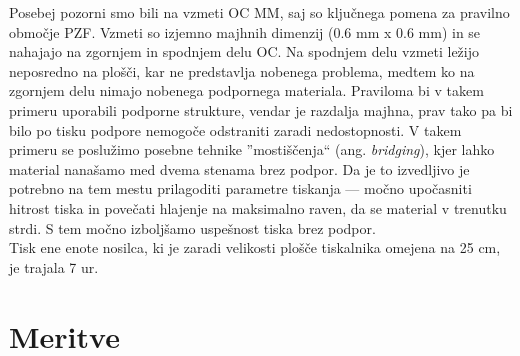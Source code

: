 \documentclass[12pt]{report}
\begin{document}
\noindent Posebej pozorni smo bili na vzmeti \ac{OC} \ac{MM}, saj so ključnega pomena za pravilno območje \ac{PZF}. Vzmeti so izjemno majhnih dimenzij (0.6 mm x 0.6 mm) in se nahajajo na zgornjem
in spodnjem delu \ac{OC}. Na spodnjem delu vzmeti ležijo neposredno na plošči, kar ne predstavlja nobenega problema, medtem ko na zgornjem delu nimajo nobenega podpornega materiala. Praviloma bi v takem
primeru uporabili podporne strukture, vendar je razdalja majhna, prav tako pa bi bilo po tisku podpore nemogoče odstraniti zaradi nedostopnosti. V takem primeru se poslužimo posebne tehnike ''mostiščenja`` (ang. \emph{bridging}), kjer lahko
material nanašamo med dvema stenama brez podpor. Da je to izvedljivo je potrebno na tem mestu prilagoditi parametre tiskanja --- močno upočasniti hitrost tiska in povečati hlajenje na maksimalno raven, da se material v trenutku strdi. S tem močno izboljšamo
uspešnost tiska brez podpor.  \\
Tisk ene enote nosilca, ki je zaradi velikosti plošče tiskalnika omejena na 25 cm, je trajala 7 ur.

\section{Meritve}


\printbibliography[heading=bibnumbered]
\end{document}

